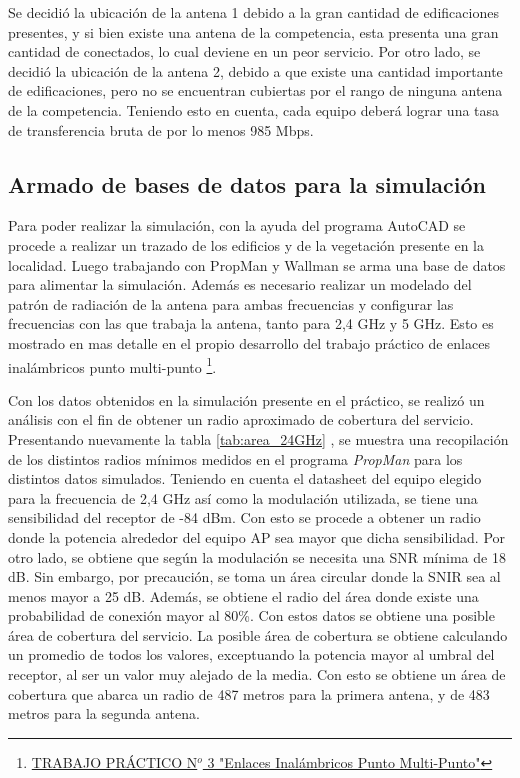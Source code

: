 \documentclass[11pt,a4paper]{article}
\begin{document}
Se decidió la ubicación de la antena 1 debido a la gran cantidad de edificaciones presentes, y si bien existe una antena de la competencia, esta presenta una gran cantidad de conectados, lo cual deviene en un peor servicio. 
Por otro lado, se decidió la ubicación de la antena 2, debido a que existe una cantidad importante de edificaciones, pero no se encuentran cubiertas por el rango de ninguna antena de la competencia. 
Teniendo esto en cuenta, cada equipo deberá lograr una tasa de transferencia bruta de por lo menos 985 Mbps.


\subsection{Armado de bases de datos para la simulación}
Para poder realizar la simulación, con la ayuda del programa AutoCAD se procede a realizar un trazado de los edificios y de la vegetación presente en la localidad. Luego trabajando con PropMan y Wallman se arma una base de datos para alimentar la simulación. Además es necesario realizar un modelado del patrón de radiación de la antena para ambas frecuencias y configurar las frecuencias con las que trabaja la antena, tanto para 2,4 GHz y 5 GHz. Esto es mostrado en mas detalle en el propio desarrollo del trabajo práctico de enlaces inalámbricos punto multi-punto \footnote{\href{https://docs.google.com/document/d/1Yf-dd03_VBnkoWaH1I282qp7TI3WjbeOEgkgxHz9xPk}{TRABAJO PRÁCTICO N$^{o}$ 3 "Enlaces Inalámbricos Punto Multi-Punto"}}.


Con los datos obtenidos en la simulación presente en el práctico, se realizó un análisis con el fin de obtener un radio aproximado de cobertura del servicio. 
Presentando nuevamente la tabla \ref{tab:area_24GHz} , se muestra una recopilación de los distintos radios mínimos medidos en el programa \textit{PropMan} para los distintos datos simulados. 
Teniendo en cuenta el datasheet del equipo elegido para la frecuencia de 2,4 GHz así como la modulación utilizada, se tiene una sensibilidad del receptor de -84 dBm. 
Con esto se procede a obtener un radio donde la potencia alrededor del equipo AP sea mayor que dicha sensibilidad. 
Por otro lado, se obtiene que según la modulación se necesita una SNR mínima de 18 dB. 
Sin embargo, por precaución, se toma un área circular donde la SNIR sea al menos mayor a 25 dB. 
Además, se obtiene el radio del área donde existe una probabilidad de conexión mayor al 80\%. 
Con estos datos se obtiene una posible área de cobertura del servicio. 
La posible área de cobertura se obtiene calculando un promedio de todos los valores, exceptuando la potencia mayor al umbral del receptor, al ser un valor muy alejado de la media. 
Con esto se obtiene un área de cobertura que abarca un radio de 487 metros para la primera antena, y de 483 metros para la segunda antena.
\end{document}
